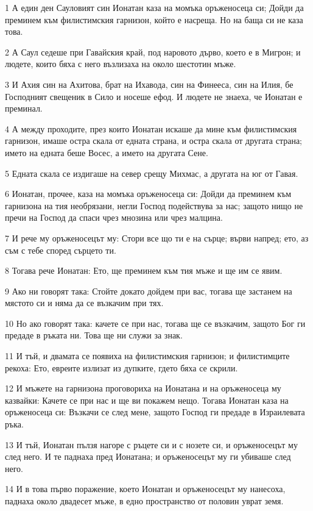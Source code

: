 \par 1 А един ден Сауловият син Ионатан каза на момъка оръженосеца си; Дойди да преминем към филистимския гарнизон, който е насреща. Но на баща си не каза това.
\par 2 А Саул седеше при Гавайския край, под наровото дърво, което е в Мигрон; и людете, които бяха с него възлизаха на около шестотин мъже.
\par 3 И Ахия син на Ахитова, брат на Ихавода, син на Финееса, син на Илия, бе Господният свещеник в Сило и носеше ефод. И людете не знаеха, че Ионатан е преминал.
\par 4 А между проходите, през които Ионатан искаше да мине към филистимския гарнизон, имаше остра скала от едната страна, и остра скала от другата страна; името на едната беше Восес, а името на другата Сене.
\par 5 Едната скала се издигаше на север срещу Михмас, а другата на юг от Гавая.
\par 6 Ионатан, прочее, каза на момъка оръженосеца си: Дойди да преминем към гарнизона на тия необрязани, негли Господ подействува за нас; защото нищо не пречи на Господ да спаси чрез мнозина или чрез малцина.
\par 7 И рече му оръженосецът му: Стори все що ти е на сърце; върви напред; ето, аз съм с тебе според сърцето ти.
\par 8 Тогава рече Ионатан: Ето, ще преминем към тия мъже и ще им се явим.
\par 9 Ако ни говорят така: Стойте докато дойдем при вас, тогава ще застанем на мястото си и няма да се възкачим при тях.
\par 10 Но ако говорят така: качете се при нас, тогава ще се възкачим, защото Бог ги предаде в ръката ни. Това ще ни служи за знак.
\par 11 И тъй, и двамата се появиха на филистимския гарнизон; и филистимците рекоха: Ето, евреите излизат из дупките, гдето бяха се скрили.
\par 12 И мъжете на гарнизона проговориха на Ионатана и на оръженосеца му казвайки: Качете се при нас и ще ви покажем нещо. Тогава Ионатан каза на оръженосеца си: Възкачи се след мене, защото Господ ги предаде в Израилевата ръка.
\par 13 И тъй, Ионатан пълзя нагоре с ръцете си и с нозете си, и оръженосецът му след него. И те паднаха пред Ионатана; и оръженосецът му ги убиваше след него.
\par 14 И в това първо поражение, което Ионатан и оръженосецът му нанесоха, паднаха около двадесет мъже, в едно пространство от половин уврат земя.
